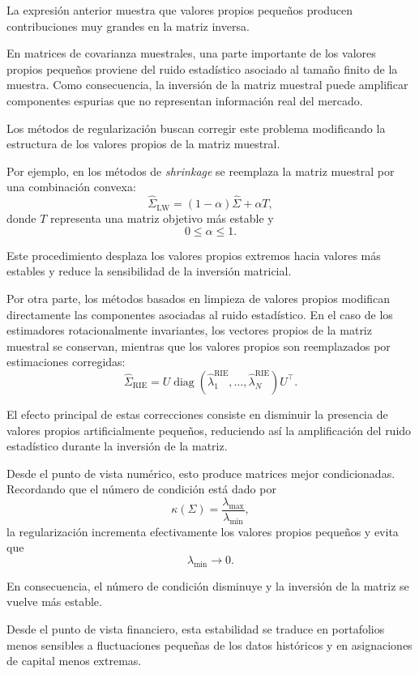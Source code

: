 \documentclass[letterpaper,12pt,oneside]{book}
\begin{document}
La expresión anterior muestra que valores propios pequeños producen contribuciones muy grandes en la matriz inversa.

En matrices de covarianza muestrales, una parte importante de los valores propios pequeños proviene del ruido estadístico asociado al tamaño finito de la muestra. Como consecuencia, la inversión de la matriz muestral puede amplificar componentes espurias que no representan información real del mercado.

Los métodos de regularización buscan corregir este problema modificando la estructura de los valores propios de la matriz muestral.

Por ejemplo, en los métodos de \textit{shrinkage} se reemplaza la matriz muestral por una combinación convexa:
\[
\widehat{\Sigma}_{\mathrm{LW}}
=
(1-\alpha)\widehat{\Sigma}
+
\alpha T,
\]
donde \(T\) representa una matriz objetivo más estable y
\[
0\leq\alpha\leq1.
\]

Este procedimiento desplaza los valores propios extremos hacia valores más estables y reduce la sensibilidad de la inversión matricial.

Por otra parte, los métodos basados en limpieza de valores propios modifican directamente las componentes asociadas al ruido estadístico. En el caso de los estimadores rotacionalmente invariantes, los vectores propios de la matriz muestral se conservan, mientras que los valores propios son reemplazados por estimaciones corregidas:
\[
\widehat{\Sigma}_{\mathrm{RIE}}
=
U
\operatorname{diag}
\left(
\widehat{\lambda}_1^{\mathrm{RIE}},
\dots,
\widehat{\lambda}_N^{\mathrm{RIE}}
\right)
U^\top.
\]

El efecto principal de estas correcciones consiste en disminuir la presencia de valores propios artificialmente pequeños, reduciendo así la amplificación del ruido estadístico durante la inversión de la matriz.

Desde el punto de vista numérico, esto produce matrices mejor condicionadas. Recordando que el número de condición está dado por
\[
\kappa(\Sigma)
=
\frac{\lambda_{\max}}{\lambda_{\min}},
\]
la regularización incrementa efectivamente los valores propios pequeños y evita que
\[
\lambda_{\min}\to0.
\]

En consecuencia, el número de condición disminuye y la inversión de la matriz se vuelve más estable.

Desde el punto de vista financiero, esta estabilidad se traduce en portafolios menos sensibles a fluctuaciones pequeñas de los datos históricos y en asignaciones de capital menos extremas.
\end{document}
